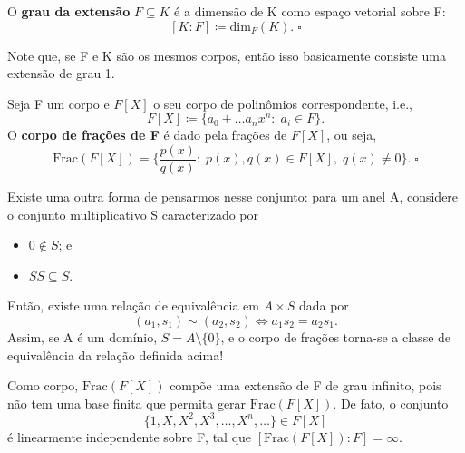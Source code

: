\documentclass[../algebraIII_notes.tex]{subfiles}
\begin{document}
\begin{def*}
	O \textbf{grau da extensão} \(F\subseteq K\) é a dimensão de K como espaço vetorial sobre F:
	\[
		[K:F]\coloneqq \mathrm{dim}_{F}(K). \; \square
	\]
\end{def*}
Note que, se F e K são os mesmos corpos, então isso basicamente consiste uma extensão de grau 1.
\begin{def*}
	Seja F um corpo e \(F[X]\) o seu corpo de polinômios correspondente, i.e.,
	\[
		F[X]\coloneqq \{a_{0}+\dotsc a_{n}x^{n}:\; a_{i}\in F\}.
	\]
	O \textbf{corpo de frações de F} é dado pela frações de \(F[X]\), ou seja,
	\[
		\mathrm{Frac}(F[X])=\biggl\{\frac{p(x)}{q(x)}:\; p(x), q(x)\in F[X],\; q(x)\neq 0\biggr\}.\; \square
	\]
\end{def*}
Existe uma outra forma de pensarmos nesse conjunto: para um anel A, considere o conjunto multiplicativo S caracterizado por
\begin{itemize}
	\item[i)] \(0\not\in S\); e
	\item[ii)] \(SS \subseteq S\).
\end{itemize}
Então, existe uma relação de equivalência em \(A\times S\) dada por
\[
	(a_1, s_1)\sim (a_2, s_2) \Longleftrightarrow a_1s_2 = a_2s_1.
\]
Assim, se A é um domínio, \(S=A\setminus{\{0\}}\), e o corpo de frações torna-se a classe de equivalência da relação definida acima!

Como corpo, \(\mathrm{Frac}(F[X])\) compõe uma extensão de F de grau infinito, pois não tem uma base finita que permita gerar \(\mathrm{Frac}(F[X])\).
De fato, o conjunto
\[
	\{1,X,X^{2},X^{3},\dotsc ,X^{n}, \dotsc \}\in F[X]
\]
é linearmente independente sobre F, tal que \([\mathrm{Frac}(F[X]):F]=\infty\).
\end{document}
